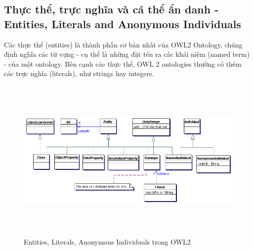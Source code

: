 \subsection{Thực thể, trực nghĩa và cá thể ẩn danh - Entities, Literals and Anonymous Individuals}
Các thực thể (entities) là thành phần cơ bản nhất của OWL2 Ontology, chúng định nghĩa các từ vựng - cụ thể là những đặt tên ra các khái niệm (named term) - của một ontology. Bên cạnh các thực thể, OWL 2 ontologies thường có thêm các trực nghĩa (literals), như strings hay integers.

\begin{figure}[ht!]
	\centering
	\includegraphics[width=150mm, height=80mm]{Figures/entities.png}
	\caption{Entities, Literals, Anonymous Individuals trong OWL2 \label{overflow}}
\end{figure}

